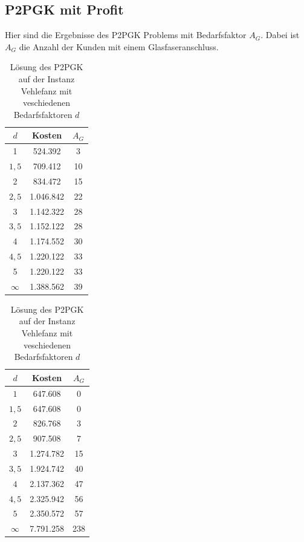 \documentclass[11pt,a4paper]{article}
\theoremstyle{my_th_style1}
\begin{document}
\subsection*{P2PGK mit Profit}
Hier sind die Ergebnisse des P2PGK Problems mit Bedarfsfaktor $A_G$. Dabei ist $A_G$ die Anzahl der Kunden mit einem Glasfaseranschluss.

\begin{table}[h]
	\centering
	\begin{minipage}{.35\textwidth}
		\centering
		\begin{tabular}{c|c|c}
			\centering
			\(d\) & Kosten & $A_G$ \\	
			\hline
			1& 524.392 & 3 \\
			\(1,5\) & 709.412 & 10 \\
			2 & 834.472 & 15 \\
			\(2,5\) & 1.046.842 & 22 \\
			3 & 1.142.322 & 28 \\
			\(3,5\) & 1.152.122 & 28 \\
			4 & 1.174.552 & 30 \\
			\(4,5\) & 1.220.122 & 33 \\	
			5 & 1.220.122 & 33 \\
			$\infty$ &  1.388.562 & 39 \\
		\end{tabular}
		\caption{Lösung des P2PGK auf der Instanz Berlin mit veschiedenen Bedarfsfaktoren \(d\)}
		\label{P2PGK_Berlin_Bedarf}
	\end{minipage}
	\hspace{0.5cm}
	\begin{minipage}{0.35\textwidth}
		\centering
		\begin{tabular}{c|c|c}
			\centering
			$d$ & Kosten & $A_G$ \\	
			\hline
			$1$   &   647.608 & 0  \\
			$1,5$ &   647.608 & 0  \\
			$2$   &   826.768 & 3  \\
			$2,5$ &   907.508 & 7  \\
			$3$   & 1.274.782 & 15 \\
			$3,5$ & 1.924.742 & 40 \\
			$4$   & 2.137.362 & 47 \\
			$4,5$ & 2.325.942 & 56 \\
			$5$   & 2.350.572 & 57 \\
			$\infty$ & 7.791.258 & 238 \\ 
		\end{tabular}
		\caption{Lösung des P2PGK auf der Instanz Vehlefanz mit veschiedenen Bedarfsfaktoren $d$}
		\label{P2PGK_Vehlefanz_Bedarf}
	\end{minipage}
\end{table}
\vspace{0.5cm}
\end{document}
